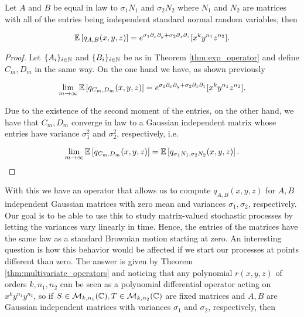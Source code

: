     \begin{corollary}
        Let $A$ and $B$ be equal in law to $\sigma_1 N_1$ and $\sigma_2 N_2$ where $N_1$ and $N_2$ are matrices with all of the entries being independent standard normal random variables, then
        
        \begin{equation*}
            \mathbb E \left[  q_{A,B}(x,y,z)  \right] = e^{\sigma_1 \partial_x \partial_y + \sigma_2 \partial_x \partial_z}[x^k y^{n_1} z^{n_2}].
        \end{equation*}
        \end{corollary}

        \begin{proof}
            Let $\{A_i\}_{i\in \mathbb N}$ and $\{B_i\}_{i\in \mathbb N}$ be as in Theorem \ref{thm:exp_operator} and define $C_m, D_m$ in the same way. On the one hand we have, as shown previously

            \begin{equation*}
                \lim_{m\to \infty} \mathbb E \left[  q_{C_m,D_m}(x,y,z) \right] =  e^{\sigma_1 \partial_x \partial_y + \sigma_2 \partial_x \partial_z}[x^k y^{n_1} z^{n_2}].
            \end{equation*}

            Due to the existence of the second moment of the entries, on the other hand, we have that $C_m, D_m$ converge in law to a Gaussian independent matrix whose entries have variance $\sigma_1^2$ and $\sigma_2^2$, respectively, i.e.

            \begin{equation*}
                \lim_{m\to \infty} \mathbb E \left[  q_{C_m,D_m}(x,y,z) \right] = \mathbb E \left[  q_{\sigma_1 N_1, \sigma_2 N_2}(x,y,z) \right].
            \end{equation*}        
        \end{proof}

        With this we have an operator that allows us to compute $q_{A,B}(x,y,z)$ for $A,B$ independent Gaussian matrices with zero mean and variances $\sigma_1,\sigma_2$, respectively. Our goal is to be able to use this to study matrix-valued stochastic processes by letting the variances vary linearly in time. Hence, the entries of the matrices have the same law as a standard Brownian motion starting at zero. An interesting question is how this behavior would be affected if we start our processes at points different than zero. The answer is given by Theorem \ref{thm:multivariate_operators} and noticing that any polynomial $r(x,y,z)$ of orders $k,n_1,n_2$ can be seen as a polynomial differential operator acting on $x^ky^{n_1}y^{n_2}$, so if $S\in \mathcal M_{k,n_1}(\mathbb C),T\in \mathcal M_{k,n_2}(\mathbb C)$ are fixed matrices and $A, B$ are Gaussian independent matrices with variances $\sigma_1$ and $\sigma_2$, respectively, then

